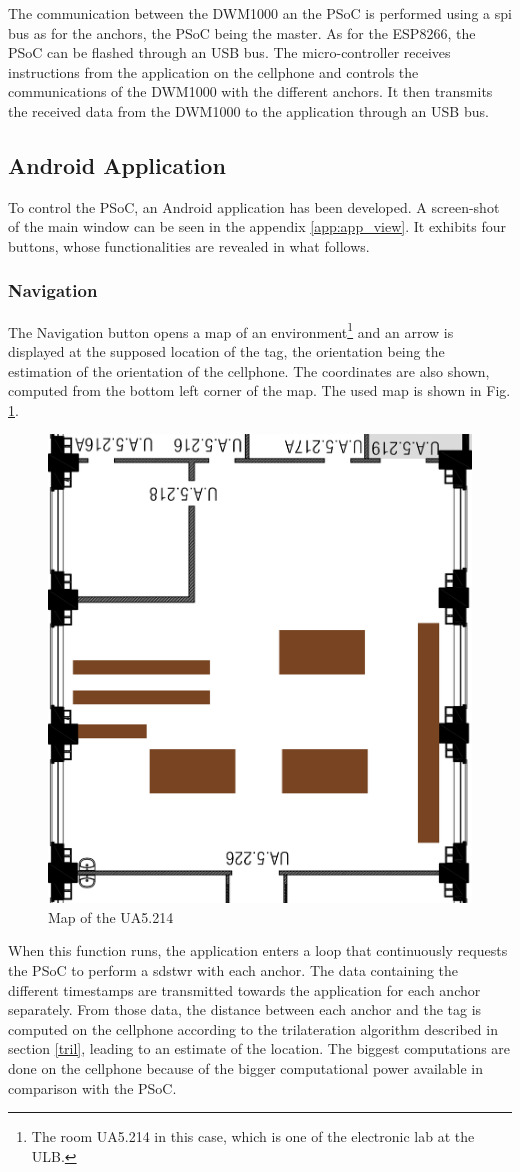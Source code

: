 The communication between the DWM1000 an the PSoC is performed using a \gls{spi} bus as for the anchors, the PSoC being the master. As for the ESP8266, the PSoC can be flashed through an USB bus. The micro-controller receives instructions from the application on the cellphone and controls the communications of the DWM1000 with the different anchors. It then transmits the received data from the DWM1000 to the application through an USB bus.

\subsection{Android Application}

To control the PSoC, an Android application has been developed. A screen-shot of the main window can be seen in the appendix \ref{app:app_view}. It exhibits four buttons, whose functionalities are revealed in what follows.

\subsubsection{Navigation}

The Navigation button opens a map of an environment\footnote{The room UA5.214 in this case, which is one of the electronic lab at the ULB.} and an arrow is displayed at the supposed location of the tag, the orientation being the estimation of the orientation of the cellphone. The coordinates are also shown, computed from the bottom left corner of the map. The used map is shown in Fig. \ref{fig:ua5_map}.

\begin{figure}[H]
	\centering
	\includegraphics[width=.4\linewidth]{Images/little_room.png}
	\caption{Map of the UA5.214}
	\label{fig:ua5_map}
\end{figure}

When this function runs, the application enters a loop that continuously requests the PSoC to perform a \gls{sdstwr} with each anchor. The data containing the different timestamps are transmitted towards the application for each anchor separately. From those data, the distance between each anchor and the tag is computed on the cellphone according to the trilateration algorithm described in section \ref{tril}, leading to an estimate of the location. The biggest computations are done on the cellphone because of the bigger computational power available in comparison with the PSoC.
\vspace{2mm}


